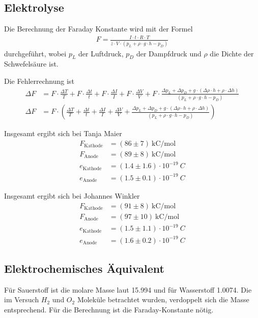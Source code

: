 \documentclass{article}
\begin{document}
\subsection{Elektrolyse}


Die Berechnung der Faraday Konstante wird mit der Formel
\begin{align}
F = \frac{I\cdot t\cdot R \cdot T}{z \cdot V \cdot (p_L +\rho \cdot g \cdot h - p_D)}
\end{align}
durchgeführt, wobei $p_L$ der Luftdruck, $p_D$ der Dampfdruck und $\rho$ die Dichte der Schwefelsäure ist.

Die Fehlerrechnung ist
\begin{align*}
\Delta F &= F\cdot \frac{\Delta T}{T} + F\cdot \frac{\Delta t}{t} + F\cdot \frac{\Delta I}{I} + F \cdot \frac{\Delta V}{V}  + F\cdot \frac{\Delta p_L + \Delta p_D + g\cdot (\Delta\rho \cdot h + \rho\cdot \Delta h)}{(p_L +\rho \cdot g \cdot h - p_D)}\\
\Delta F &= F\cdot \left(\frac{\Delta T}{T} + \frac{\Delta t}{t} + \frac{\Delta I}{I} + \frac{\Delta V}{V}  + \frac{\Delta p_L + \Delta p_D + g\cdot (\Delta\rho \cdot h + \rho\cdot \Delta h)}{(p_L +\rho \cdot g \cdot h - p_D)}\right)
\end{align*}


Insgesamt ergibt sich bei Tanja Maier
\begin{align*}
F_\text{Kathode} &= (86 \pm 7)~\text{kC/mol}\\
F_\text{Anode} &= (89 \pm 8)~\text{kC/mol} \\
e_\text{Kathode} &= (1.4 \pm 1.6)\cdot 10^{-19}~C \\
e_\text{Anode} &= (1.5 \pm 0.1)\cdot 10^{-19}~C  
\end{align*}

Insgesamt ergibt sich bei Johannes Winkler
\begin{align*}
F_\text{Kathode} &= (91 \pm 8)~\text{kC/mol}\\
F_\text{Anode} &= (97 \pm 10)~\text{kC/mol} \\
e_\text{Kathode} &= (1.5 \pm 1.1)\cdot 10^{-19}~C \\
e_\text{Anode} &= (1.6 \pm 0.2)\cdot 10^{-19}~C  
\end{align*}


\subsection{Elektrochemisches Äquivalent}

Für Sauerstoff ist die molare Masse laut \cite{equiv} 15.994 und für Wasserstoff 1.0074. Die im Versuch $H_2$ und $O_2$ Moleküle betrachtet wurden, verdoppelt sich die Masse entsprechend. Für die Berechnung ist die Faraday-Konstante nötig.
\end{document}
